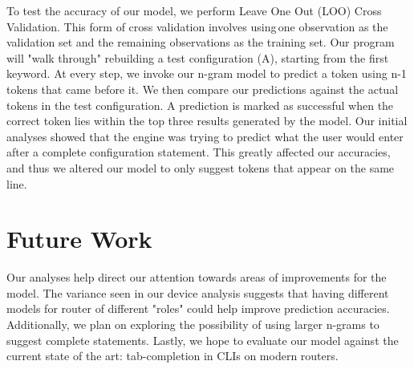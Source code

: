 To test the accuracy of our model, we perform Leave One Out (LOO) Cross Validation. This form of cross validation involves using one observation as the validation set and the remaining observations as the training set. Our program will "walk through" rebuilding a test configuration (A), starting from the first keyword. At every step, we invoke our n-gram model to predict a token using n-1 tokens that came before it. We then compare our predictions against the actual tokens in the test configuration. A prediction is marked as successful when the correct token lies within the top three results generated by the model. Our initial analyses showed that the engine was trying to predict what the user would enter after a complete configuration statement. This greatly affected our accuracies, and thus we altered our model to only suggest tokens that appear on the same line.\\

\section{Future Work}

Our analyses help direct our attention towards areas of improvements for the model. The variance seen in our device analysis suggests that having different models for router of different "roles" could help improve prediction accuracies. Additionally, we plan on exploring the possibility of using larger n-grams to suggest complete statements. Lastly, we hope to evaluate our model against the current state of the art: tab-completion in CLIs on modern routers.